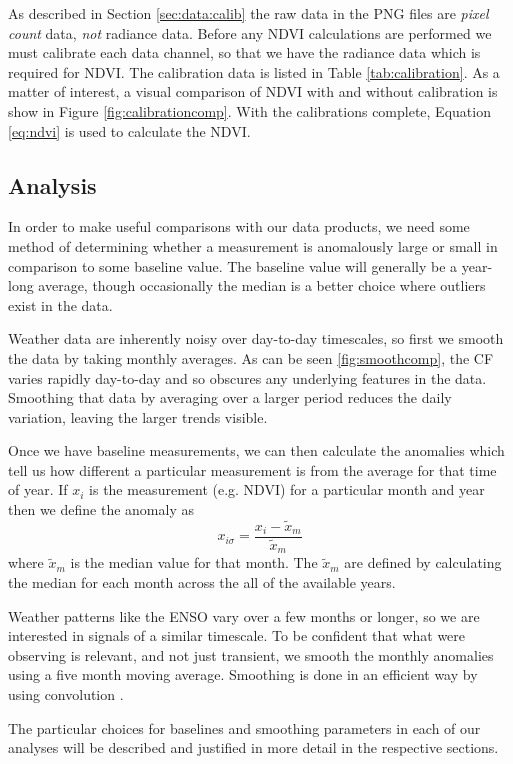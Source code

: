 As described in Section \ref{sec:data:calib} the raw data in the PNG files are
\emph{pixel count} data, \emph{not} radiance data. Before any NDVI calculations
are performed we must calibrate each data channel, so that we have the radiance
data which is required for NDVI. The calibration data is listed in Table
\ref{tab:calibration}. As a matter of interest, a visual comparison of NDVI with
and without calibration is show in Figure \ref{fig:calibrationcomp}. With the
calibrations complete, Equation \eqref{eq:ndvi} is used to calculate the NDVI.

\subsection{Analysis}
\label{sec:analysis}
In order to make useful comparisons with our data products, we need some method
of determining whether a measurement is anomalously large or small in comparison
to some baseline value. The baseline value will generally be a year-long
average, though occasionally the median is a better choice where outliers exist
in the data. 

Weather data are inherently noisy over day-to-day timescales, so first we smooth
the data by taking monthly averages. As can be seen \ref{fig:smoothcomp}, the CF
varies rapidly day-to-day and so obscures any underlying features in the
data. Smoothing that data by averaging over a larger period reduces the daily
variation, leaving the larger trends visible. 

Once we have baseline measurements, we can then calculate the anomalies which
tell us how different a particular measurement is from the average for that time
of year. If $x_{i}$ is the measurement (e.g. NDVI) for a particular month and
year then we define the anomaly as
\begin{equation}
  x_{i\sigma}=\frac{x_{i}-\tilde{x}_m}{\tilde{x}_m}
  \label{eq:anoms}
\end{equation}
where $\tilde{x}_m$ is the median value for that month. The $\tilde{x}_m$ are
defined by calculating the median for each month across the all of the available
years.

Weather patterns like the ENSO vary over a few months or longer, so we are
interested in signals of a similar timescale. To be confident that what were
observing is relevant, and not just transient, we smooth the monthly anomalies
using a five month moving average. Smoothing is done in an efficient way by
using convolution \citep{gorry1990}.

The particular choices for baselines and smoothing parameters in each of our
analyses will be described and justified in more detail in the respective
sections.



